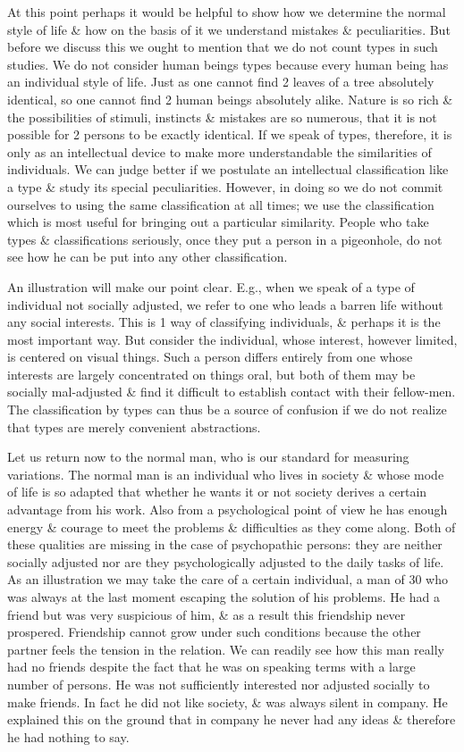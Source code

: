 \documentclass{article}
\numberwithin{equation}{section}
\begin{document}
At this point perhaps it would be helpful to show how we determine the normal style of life \& how on the basis of it we understand mistakes \& peculiarities. But before we discuss this we ought to mention that we do not count types in such studies. We do not consider human beings types because every human being has an individual style of life. Just as one cannot find 2 leaves of a tree absolutely identical, so one cannot find 2 human beings absolutely alike. Nature is so rich \& the possibilities of stimuli, instincts \& mistakes are so numerous, that it is not possible for 2 persons to be exactly identical. If we speak of types, therefore, it is only as an intellectual device to make more understandable the similarities of individuals. We can judge better if we postulate an intellectual classification like a type \& study its special peculiarities. However, in doing so we do not commit ourselves to using the same classification at all times; we use the classification which is most useful for bringing out a particular similarity. People who take types \& classifications seriously, once they put a person in a pigeonhole, do not see how he can be put into any other classification.

An illustration will make our point clear. E.g., when we speak of a type of individual not socially adjusted, we refer to one who leads a barren life without any social interests. This is 1 way of classifying individuals, \& perhaps it is the most important way. But consider the individual, whose interest, however limited, is centered on visual things. Such a person differs entirely from one whose interests are largely concentrated on things oral, but both of them may be socially mal-adjusted \& find it difficult to establish contact with their fellow-men. The classification by types can thus be a source of confusion if we do not realize that types are merely convenient abstractions.

Let us return now to the normal man, who is our standard for measuring variations. The normal man is an individual who lives in society \& whose mode of life is so adapted that whether he wants it or not society derives a certain advantage from his work. Also from a psychological point of view he has enough energy \& courage to meet the problems \& difficulties as they come along. Both of these qualities are missing in the case of psychopathic persons: they are neither socially adjusted nor are they psychologically adjusted to the daily tasks of life. As an illustration we may take the care of a certain individual, a man of 30 who was always at the last moment escaping the solution of his problems. He had a friend but was very suspicious of him, \& as a result this friendship never prospered. Friendship cannot grow under such conditions because the other partner feels the tension in the relation. We can readily see how this man really had no friends despite the fact that he was on speaking terms with a large number of persons. He was not sufficiently interested nor adjusted socially to make friends. In fact he did not like society, \& was always silent in company. He explained this on the ground that in company he never had any ideas \& therefore he had nothing to say.
\end{document}

